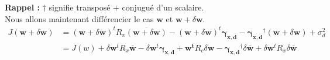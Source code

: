\documentclass[12pt]{article}
\begin{document}
\textbf{Rappel :} $\dag$ signifie transposé $+$ conjugué d'un scalaire.  \\

Nous allons maintenant différencier le cas $\mathbf{w}$ et $\mathbf{w}+\delta \mathbf{w}$.\\
\begin{align}
    J(\mathbf{w}+\delta \mathbf{w}) &= (\mathbf{w}+\delta \mathbf{w})^t R_x \overline{(\mathbf{w}+\delta \mathbf{w})} - (\mathbf{w}+\delta \mathbf{w})^t \mathbf{\gamma_{x,d}} - \mathbf{\gamma_{x,d}}^\dag (\mathbf{w}+\delta \mathbf{w}) + \sigma_d^2 \nonumber \\
    &= J(w) + \delta \mathbf{w}^t R_x \overline{\mathbf{w}} - \delta \mathbf{w}^t \mathbf{\gamma_{x,d}} + \mathbf{w^t}R_c\delta\mathbf{w} - \mathbf{\gamma_{x,d}}^\dag \delta \mathbf{\overline{w}} + \delta \mathbf{w}^t R_x \delta \mathbf{\overline{w}} \nonumber
\end{align}
\end{document}
